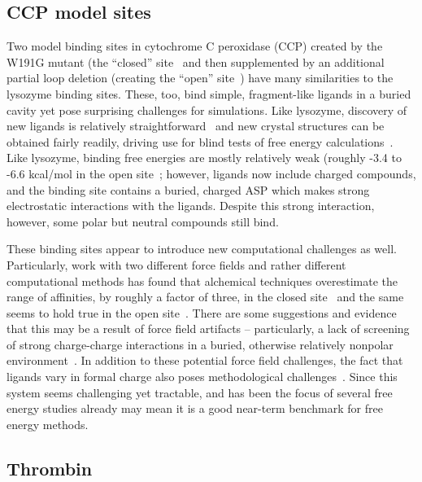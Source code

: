 \documentclass[aps,pre,twocolumn,nofootinbib,superscriptaddress,10pt, final,tightenlines]{revtex4-1}
\begin{document}
\subsection{CCP model sites}

Two model binding sites in cytochrome C peroxidase (CCP) created by the W191G mutant (the ``closed'' site~\cite{fitzgerald_ligand-gated_1996, rocklin_blind_2013} and then supplemented by an additional partial loop deletion (creating the ``open'' site~\cite{musah_artificial_2002, rosenfeld_excision_2002, rocklin_blind_2013}) have many similarities to the lysozyme binding sites. 
These, too, bind simple, fragment-like ligands in a buried cavity yet pose surprising challenges for simulations. Like lysozyme, discovery of new ligands is relatively straightforward~\cite{brenk_probing_2006, rocklin_blind_2013} and new crystal structures can be obtained fairly readily, driving use for blind tests of free energy calculations~\cite{rocklin_blind_2013}. 
Like lysozyme, binding free energies are mostly relatively weak (roughly -3.4 to -6.6 kcal/mol in the open site~\cite{rocklin_blind_2013}; however, ligands now include charged compounds, and the binding site contains a buried, charged ASP which makes strong electrostatic interactions with the ligands. 
Despite this strong interaction, however, some polar but neutral compounds still bind.

These binding sites appear to introduce new computational challenges as well. Particularly, work with two different force fields and rather different computational methods has found that alchemical techniques overestimate the range of affinities, by roughly a factor of three, in the closed site~\cite{banba_free_2000, banba_efficient_2000} and the same seems to hold true in the open site~\cite{rocklin_blind_2013}. 
There are some suggestions and evidence that this may be a result of force field artifacts -- particularly, a lack of screening of strong charge-charge interactions in a buried, otherwise relatively nonpolar environment~\cite{rocklin_blind_2013}. 
In addition to these potential force field challenges, the fact that ligands vary in formal charge also poses methodological challenges~\cite{rocklin_calculating_2013}. 
Since this system seems challenging yet tractable, and has been the focus of several free energy studies already may mean it is a good near-term benchmark for free energy methods.

\subsection{Thrombin}
\end{document}
